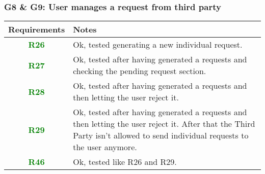 \subsubsection{G8 \& G9: User manages a request from third party}
  \begin{adjustwidth}{1cm}{}
        \begin{longtable}{|c|p{}|}
            \hline
            \textbf{Requirements} & \textbf{Notes} \\
            \hline
            \textbf{\textcolor{green}{R26}} & Ok, tested generating a new individual request.  \\
            \hline
            \textbf{\textcolor{green}{R27}} & Ok, tested after having generated a requests and checking  the pending request section. \\
            \hline
            \textbf{\textcolor{green}{R28}} & Ok, tested after having generated a requests and then letting the user reject it. \\
            \hline
            \textbf{\textcolor{green}{R29}} & Ok, tested after having generated a requests and then letting the user reject it. After that the Third Party isn't allowed to send individual requests to the user anymore. \\
            \hline
            \textbf{\textcolor{green}{R46}} & Ok, tested like R26 and R29.  \\
            \hline            
            
            
        \end{longtable}
    \end{adjustwidth}
    
